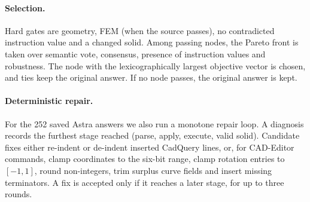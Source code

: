 \paragraph{Selection.}
Hard gates are geometry, FEM (when the source passes), no contradicted instruction value and a changed solid. Among passing nodes, the Pareto front is taken over semantic vote, consensus, presence of instruction values and robustness. The node with the lexicographically largest objective vector is chosen, and ties keep the original answer. If no node passes, the original answer is kept.

\paragraph{Deterministic repair.}
For the 252 saved Astra answers we also run a monotone repair loop. A diagnosis records the furthest stage reached (parse, apply, execute, valid solid). Candidate fixes either re-indent or de-indent inserted CadQuery lines, or, for CAD-Editor commands, clamp coordinates to the six-bit range, clamp rotation entries to $[-1,1]$, round non-integers, trim surplus curve fields and insert missing terminators. A fix is accepted only if it reaches a later stage, for up to three rounds.
